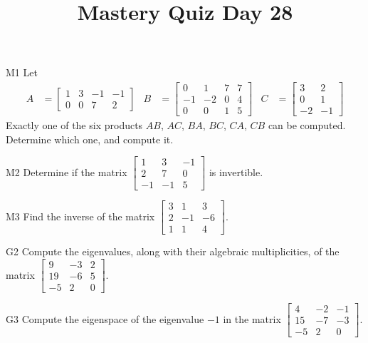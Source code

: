 \documentclass{sbgLAquiz}
\title{Mastery Quiz Day 28 }
\begin{document}
\begin{problem}{M1}
Let
\begin{align*}
A &= \begin{bmatrix} 1 & 3 & -1 & -1 \\ 0 & 0 & 7 & 2 \end{bmatrix} & B &= \begin{bmatrix} 0 & 1 & 7 & 7 \\ -1 & -2 & 0 & 4 \\ 0 & 0 & 1 & 5 \end{bmatrix} & C&=\begin{bmatrix} 3 & 2 \\ 0 & 1 \\ -2 & -1 \end{bmatrix}
\end{align*}
Exactly one of the six products $AB$, $AC$, $BA$, $BC$, $CA$, $CB$ can be computed.  Determine which one, and compute it.
\end{problem}

\begin{problem}{M2} Determine if the matrix $\begin{bmatrix} 1 & 3 & -1 \\ 2 & 7 & 0 \\ -1 & -1 & 5 \end{bmatrix}$ is invertible.
\end{problem}
\newpage

\begin{problem}{M3}
  Find the inverse of the matrix
  \(\begin{bmatrix}
    3 & 1 & 3  \\
    2 & -1 & -6  \\
    1 & 1 & 4
  \end{bmatrix}\).
\end{problem}

\begin{problem}{G2}
Compute the eigenvalues, along with their algebraic multiplicities, of the matrix $ \begin{bmatrix} 9 & -3 & 2 \\ 19 & -6 & 5 \\ -5 & 2 & 0 \end{bmatrix}$.
\end{problem}
\newpage

\begin{problem}{G3}
Compute the eigenspace of the eigenvalue $-1$ in the matrix $\begin{bmatrix} 4 & -2 & -1 \\ 15 & -7 & -3 \\ -5 & 2 & 0 \end{bmatrix}$.
\end{problem}
\end{document}
